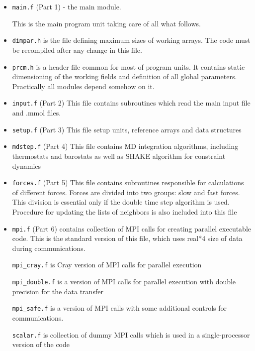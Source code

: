 \documentclass{article}
\begin{document}
\begin{itemize}

\item
\verb|main.f| (Part 1) - the main module.

This is the main program unit taking care of all what follows. 

\item
\verb|dimpar.h| is the file defining maximum sizes of working arrays.
The code must be recompiled after any change in this file.

\item
\verb|prcm.h|  is a header file common for most of program units.
It contains static dimensioning of the working fields and definition of 
all global parameters. Practically all modules depend somehow on it.

\item
\verb|input.f| (Part 2)  This file contains subroutines which read
the main input file and .mmol files.

\item
\verb|setup.f| (Part 3) This file setup units, reference arrays and data 
structures 

\item
\verb|mdstep.f| (Part 4) This file contains MD integration algorithms,
including thermostats and barostats as well as SHAKE algorithm for 
constraint dynamics

\item
\verb|forces.f| (Part 5) 
This file contains subroutines responsible for calculations 
of different forces. Forces are divided into two groups:
slow and fast forces. This division is essential only if
the double time step algorithm is used. Procedure for updating 
the lists of neighbors is also included into this file 

\item
\verb|mpi.f| (Part 6) contains collection of MPI calls for creating 
parallel executable code. This is the standard version of this file, 
which uses real*4 size of data during communications.

\verb|mpi_cray.f| is Cray version of MPI calls for parallel 
execution

\verb|mpi_double.f| is a version of MPI calls for parallel 
execution with double precision for the data transfer
 
\verb|mpi_safe.f| is a version of MPI calls with some additional 
controls for communications.

\verb|scalar.f| is collection of dummy MPI calls which is used in a 
single-processor version of the code


\end{itemize}
\end{document}
